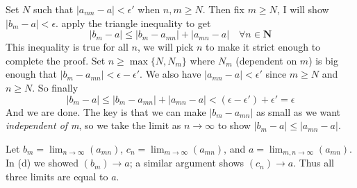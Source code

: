 \begin{solution}
{    Set $N$ such that $|a_{mn} - a| < \epsilon'$ when $n,m \ge N$.
    Then fix $m \ge N$, I will show $|b_m-a|<\epsilon$. apply the triangle inequality to get
    $$
    |b_m - a| \le |b_m - a_{mn}| + |a_{mn} - a|\quad\forall n \in \mathbf{N}
    $$
    This inequality is true for all $n$, we will pick $n$ to make it strict enough to complete the proof.
    Set $n \ge \max\{N, N_m\}$ where $N_m$ (dependent on $m$) is big enough that $|b_m - a_{mn}| < \epsilon-\epsilon'$.
    We also have $|a_{mn} - a| < \epsilon'$ since $m \ge N$ and $n \ge N$. So finally
    $$
    |b_m - a| \le |b_m - a_{mn}| + |a_{mn} - a| < (\epsilon-\epsilon') + \epsilon' = \epsilon
    $$
    And we are done. The key is that we can make $|b_{m} - a_{mn}|$ as small as we want \emph{independent of m}, so we take the limit as $n \to \infty$ to show $|b_m - a| \le |a_{mn} - a|$.
  \item Let $b_m = \lim_{n \to \infty} (a_{mn})$, $c_n = \lim_{m \to \infty} (a_{mn})$, and $a = \lim_{m,n\to\infty} (a_{mn})$. In (d) we showed $(b_m) \to a$; a similar argument shows $(c_n) \to a$. Thus all three limits are equal to $a$.
  }
\end{solution}
